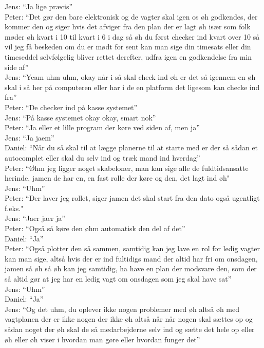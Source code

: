 Jens: “Ja lige præcis”\\
Peter: “Det gør den bare elektronisk og de vagter skal igen os øh godkendes, der kommer den og siger hvis det afviger fra den plan der er lagt øh især som folk møder øh kvart i 10 til kvart i 6 i dag så øh du først checker ind kvart over 10 så vil jeg få beskeden om du er mødt for sent kan man sige din timesats eller din timeseddel selvfølgelig bliver rettet derefter, udfra igen en godkendelse fra min side af”\\
Jens: “Yeam uhm uhm, okay når i så skal check ind øh er det så igennem en øh skal i så her på computeren eller har i de en platform det ligesom kan checke ind fra”\\
Peter: “De checker ind på kasse systemet”\\
Jens: “På kasse systemet okay okay, smart nok”\\
Peter: “Ja eller et lille program der køre ved siden af, men ja”\\
Jens: “Ja jaem”\\
Daniel: “Når du så skal til at lægge planerne til at starte med er der så sådan et autocomplet eller skal du selv ind og træk mand ind hverdag”\\
Peter: “Øhm jeg ligger noget skabeloner, man kan sige alle de fuldtidsansatte herinde, jamen de har en, en fast rolle der køre og den, det lagt ind øh"\\
Jens: “Uhm”\\
Peter: “Der laver jeg rollet, siger jamen det skal start fra den dato også ugentligt f.eks."\\ 
Jens: “Jaer jaer ja”\\
Peter: “Også så køre den øhm automatisk den del af det”\\
Daniel: “Ja”\\
Peter: “Også plotter den så sammen, samtidig kan jeg lave en rol for ledig vagter kan man sige, altså hvis der er ind fultidigs mand der altid har fri om onsdagen, jamen så øh så øh kan jeg samtidig, ha have en plan der modsvare den, som der så altid gør at jeg har en ledig vagt om onsdagen som jeg skal have sat”\\
Jens: “Uhm”\\
Daniel: “Ja”\\
Jens: “Og det uhm, du oplever ikke nogen problemer med øh altså øh med vagtplanen der er ikke nogen der ikke øh altså når når nogen skal sættes op og sådan noget der øh skal de så medarbejderne selv ind og sætte det hele op eller øh eller øh viser i hvordan man gøre eller hvordan funger det”\\
